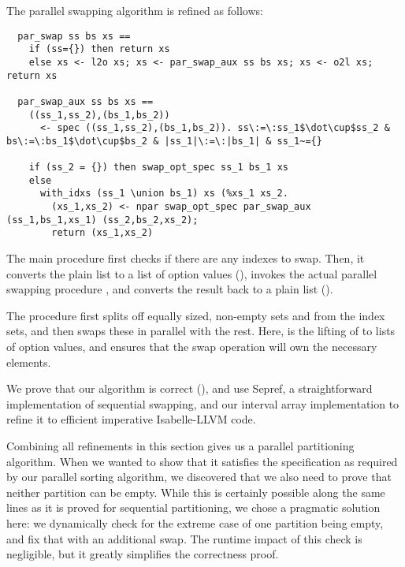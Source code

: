 \documentclass[sn-mathphys,Numbered]{sn-jnl}
\theoremstyle{thmstyleone}%
\theoremstyle{definition}%
\theoremstyle{thmstylethree}%
\begin{document}
  The parallel swapping algorithm is refined as follows:
  \begin{lstlisting}
  par_swap ss bs xs ==
    if (ss={}) then return xs
    else xs <- l2o xs; xs <- par_swap_aux ss bs xs; xs <- o2l xs; return xs

  par_swap_aux ss bs xs ==
    ((ss_1,ss_2),(bs_1,bs_2))
      <- spec ((ss_1,ss_2),(bs_1,bs_2)). ss\:=\:ss_1$\dot\cup$ss_2 & bs\:=\:bs_1$\dot\cup$bs_2 & |ss_1|\:=\:|bs_1| & ss_1~={}

    if (ss_2 = {}) then swap_opt_spec ss_1 bs_1 xs
    else
      with_idxs (ss_1 \union bs_1) xs (%xs_1 xs_2.
        (xs_1,xs_2) <- npar swap_opt_spec par_swap_aux (ss_1,bs_1,xs_1) (ss_2,bs_2,xs_2);
        return (xs_1,xs_2)
  \end{lstlisting}
  The main procedure  first checks if there are any indexes to swap.
  Then, it converts the plain list to a list of option values (), invokes the actual parallel swapping procedure ,
  and converts the result back to a plain list ().

  The  procedure first splits off equally sized, non-empty sets  and  from the index sets,
  and then swaps these in parallel with the rest. Here,  is the lifting of  to lists of option values,
  and  ensures that the swap operation will own the necessary elements.

  We prove that our algorithm is correct (),
  and use Sepref, a straightforward implementation of sequential swapping, and our interval array implementation
  to refine it to efficient imperative Isabelle-LLVM code.

  Combining all refinements in this section gives us a parallel partitioning algorithm. When we wanted to show that it
  satisfies the specification  as required by our parallel sorting algorithm, we discovered that we
  also need to prove that neither partition can be empty. While this is certainly possible along the same lines as it is proved for sequential partitioning, we chose a pragmatic solution here: we dynamically check for the extreme case of
  one partition being empty, and fix that with an additional swap. The runtime impact of this check is negligible, but it greatly simplifies the correctness proof.
\end{document}
